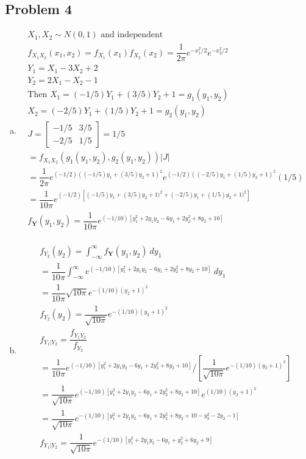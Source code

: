 \documentclass{article}
\begin{document}
\begin{flushleft}
\section*{Problem 4}
\begin{enumerate}[(a)]
\item
\begin{multline*}
X_1, X_2 \sim N(0,1) \text{ and independent}\\
f_{X_1X_2}(x_1,x_2)=f_{X_1}(x_1)f_{X_2}(x_2)=\dfrac{1}{2\pi}e^{-x_1^2/2}e^{-x_2^2/2}\\
Y_1=X_1-3X_2+2\\
Y_2=2X_1-X_2-1\\
\text{Then } X_1=(-1/5)Y_1+(3/5)Y_2+1=g_1(y_1,y_2)\\
X_2=(-2/5)Y_1+(1/5)Y_2+1=g_2(y_1,y_2)\\
J=\begin{bmatrix}
-1/5 & 3/5\\
-2/5 & 1/5
\end{bmatrix}=1/5\\
=f_{X_1X_2}(g_1(y_1,y_2),g_2(y_1,y_2))|J|\\
=\dfrac{1}{2\pi}e^{(-1/2)((-1/5)y_1+(3/5)y_2+1)^2}e^{(-1/2)((-2/5)y_1+(1/5)y_2+1)^2}(1/5)\\
=\dfrac{1}{10\pi}e^{(-1/2)\left[(-1/5)y_1+(3/5)y_2+1)^2+(-2/5)y_1+(1/5)y_2+1)^2\right]}\\
f_{\boldsymbol{Y}}(y_1,y_2)=\dfrac{1}{10\pi}e^{(-1/10)[y_1^2+2y_1y_2-6y_1+2y_2^2+8y_2+10]}\\
\end{multline*}
\item
\begin{multline*}
f_{Y_2}(y_2)=\int_{-\infty}^{\infty}f_{\boldsymbol{Y}}(y_1,y_2) \ dy_1\\
=\dfrac{1}{10\pi}\int_{-\infty}^{\infty}e^{(-1/10)[y_1^2+2y_1y_2-6y_1+2y_2^2+8y_2+10]} \ dy_1\\
=\dfrac{1}{10\pi}\sqrt{10\pi}e^{-(1/10)(y_2+1)^2}\\
f_{Y_2}(y_2)=\dfrac{1}{\sqrt{10\pi}}e^{-(1/10)(y_2+1)^2}\\
f_{Y_1|Y_2}=\dfrac{f_{Y_1Y_2}}{f_{Y_2}}\\
=\dfrac{1}{10\pi}e^{(-1/10)[y_1^2+2y_1y_2-6y_1+2y_2^2+8y_2+10]}/\left[\dfrac{1}{\sqrt{10\pi}}e^{-(1/10)(y_2+1)^2}\right]\\
=\dfrac{1}{\sqrt{10\pi}}e^{(-1/10)[y_1^2+2y_1y_2-6y_1+2y_2^2+8y_2+10]}e^{(1/10)(y_2+1)^2}\\
=\dfrac{1}{\sqrt{10\pi}}e^{-(1/10)[y_1^2+2y_1y_2-6y_1+2y_2^2+8y_2+10-y_2^2-2y_2-1]}\\
f_{Y_1|Y_2}=\dfrac{1}{\sqrt{10\pi}}e^{-(1/10)[y_1^2+2y_1y_2-6y_1+y_2^2+6y_2+9]}\\
\end{multline*}
\end{enumerate}

\end{flushleft}
\end{document}
